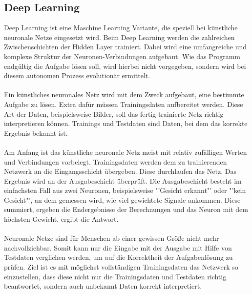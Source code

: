\documentclass[12pt,oneside,a4paper,parskip]{scrbook}
\begin{document}
\subsection{Deep Learning}
Deep Learning ist eine Maschine Learning Variante, die speziell bei künstliche neuronale Netze eingesetzt wird. Beim Deep Learning werden die zahlreichen Zwischenschichten der Hidden Layer trainiert. Dabei wird eine umfangreiche und komplexe Struktur der Neuronen-Verbindungen aufgebaut. Wie das Programm endgültig die Aufgabe lösen soll, wird hierbei nicht vorgegeben, sondern wird bei diesem autonomen Prozess evolutionär ermittelt.
\\\\
Ein künstliches neuronales Netz wird mit dem Zweck aufgebaut, eine bestimmte Aufgabe zu lösen. Extra dafür müssen Trainingsdaten aufbereitet werden. Diese Art der Daten, beispielsweise Bilder, soll das fertig trainierte Netz richtig interpretieren können. Trainings und Testdaten sind Daten, bei dem das korrekte Ergebnis bekannt ist.
\\\\
Am Anfang ist das künstliche neuronale Netz meist mit relativ zufälligen Werten und Verbindungen vorbelegt. Trainingsdaten werden dem zu trainierenden Netzwerk an die Eingangsschicht übergeben. Diese durchlaufen das Netz. Das Ergebnis wird an der Ausgabeschicht überprüft. Die Ausgabeschicht besteht im einfachsten Fall aus zwei Neuronen, beispielsweise "'Gesicht erkannt"' oder "'kein Gesicht"', an dem gemessen wird, wie viel gewichtete Signale ankommen. Diese summiert, ergeben die Endergebnisse der Berechnungen und das Neuron mit dem höchsten Gewicht, ergibt die Antwort.
\\\\
Neuronale Netze sind für Menschen ab einer gewissen Größe nicht mehr nachvollziehbar. Somit kann nur die Eingabe mit der Ausgabe mit Hilfe von Testdaten verglichen werden, um auf die Korrektheit der Aufgabenlösung zu prüfen. Ziel ist es mit möglichst vollständigen Trainingsdaten das Netzwerk so einzustellen, dass diese nicht nur die Trainingsdaten und Testdaten richtig beantwortet, sondern auch unbekannt Daten korrekt interpretiert.
\end{document}
